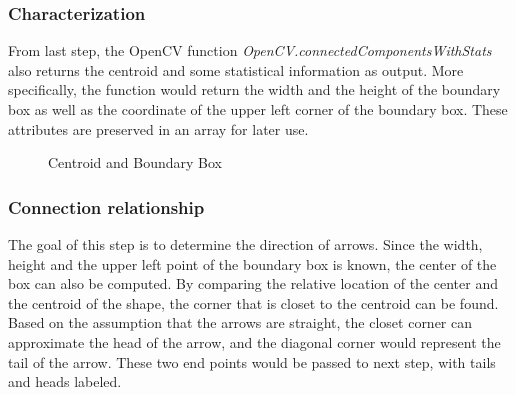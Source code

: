 \documentclass[conference,twocolumn]{IEEEtran}
\begin{document}
\subsubsection{Characterization}
    From last step, the OpenCV function  \emph{OpenCV.connectedComponentsWithStats} also returns the centroid and some statistical information as output. More specifically, the function would return the width and the height of the boundary box as well as the coordinate of the upper left corner of the boundary box. These attributes are preserved in an array for later use.

\begin{figure}[!htbp]
    \centering
    \caption{Centroid and Boundary Box}
    \label{fig:rectNdiam}
\end{figure}

\subsubsection{Connection relationship} 
    The goal of this step is to determine the direction of arrows. Since the width, height and the upper left point of the boundary box is known, the center of the box can also be computed. By comparing the relative location of the center and the centroid of the shape, the corner that is closet to the centroid can be found. Based on the assumption that the arrows are straight, the closet corner can 
    approximate the head of the arrow, and the diagonal corner would represent the tail of the arrow. These two end points would be passed to next step, with tails and heads labeled.
    
\end{document}
